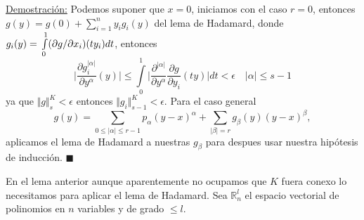 \documentclass{report}
\theoremstyle{definition}
\begin{document}
\underline{Demostraci\'on:} Podemos suponer que $x=0$, iniciamos con el caso $r=0$, entonces $g(y) = g(0) + \sum\limits_{i=1}^n y_i g_i (y)$ del lema de Hadamard, donde $g_i (y) = \\ \int\limits_0^1 (\partial g / \partial x_i )(t y_i) dt$, entonces $$\vert \frac{\partial g_i^{\vert \alpha \vert}}{\partial y^\alpha} (y) \vert \leq \int\limits_0^1 \vert \frac{\partial^{\vert \alpha \vert}}{\partial y^\alpha} \frac{\partial g}{ \partial y_i} (ty) \vert dt < \epsilon \quad \vert \alpha \vert \leq s-1  $$ ya que $\Vert g \Vert_s^K < \epsilon $ entonces $\Vert g_i \Vert_{s-1}^K < \epsilon$. Para el caso general $$g(y) = \sum\limits_{0 \leq \vert \alpha \vert \leq r-1} p_\alpha (y - x)^\alpha + \sum\limits_{\vert \beta \vert = r} g_\beta(y)(y-x)^\beta ,$$ aplicamos el lema de Hadamard a nuestras $g_\beta$ para despues usar nuestra hip\'otesis de inducci\'on. $\blacksquare$

En el lema anterior aunque aparentemente no ocupamos que $K$ fuera conexo lo necesitamos para aplicar el lema de Hadamard. Sea $\mathbb{R}^l_n$ el espacio vectorial de polinomios en $n$ variables y de grado $\leq l$.
\end{document}
